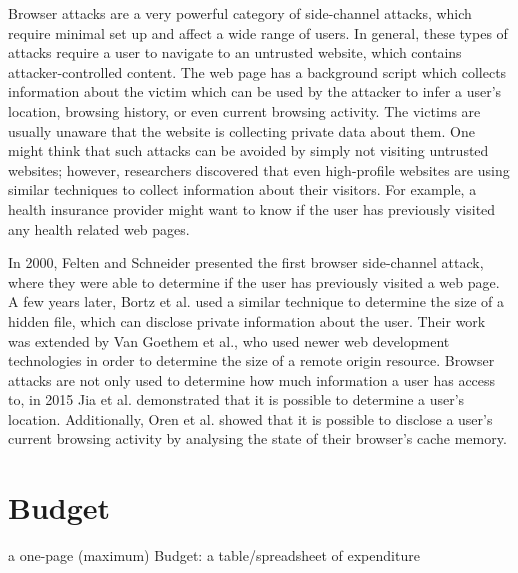 \documentclass[a4paper,11pt]{article}
\begin{document}
Browser attacks are a very powerful category of side-channel attacks, which require minimal set up and affect a wide range of users. In general, these types of attacks require a user to navigate to an untrusted website, which contains attacker-controlled content. The web page has a background script which collects information about the victim which can be used by the attacker to infer a user's location, browsing history, or even current browsing activity. The victims are usually unaware that the website is collecting private data about them. One might think that such attacks can be avoided by simply not visiting untrusted websites; however, researchers discovered that even high-profile websites are using similar techniques to collect information about their visitors\cite{jang2010empirical}. For example, a health insurance provider might want to know if the user has previously visited any health related web pages.

In 2000, Felten and Schneider\cite{felten2000timing} presented the first browser side-channel attack, where they were able to determine if the user has previously visited a web page. A few years later, Bortz et al.\cite{bortz2007exposing} used a similar technique to determine the size of a hidden file, which can disclose private information about the user. Their work was extended by Van Goethem et al.\cite{van2015clock}, who used newer web development technologies in order to determine the size of a remote origin resource. Browser attacks are not only used to determine how much information a user has access to, in 2015 Jia et al.\cite{jia2015know} demonstrated that it is possible to determine a user's location. Additionally, Oren et al.\cite{oren2015spy} showed that it is possible to disclose a user's current browsing activity by analysing the state of their browser's cache memory.





\newpage
\section*{Budget}

a one-page (maximum) Budget: a table/spreadsheet of expenditure
\end{document}
